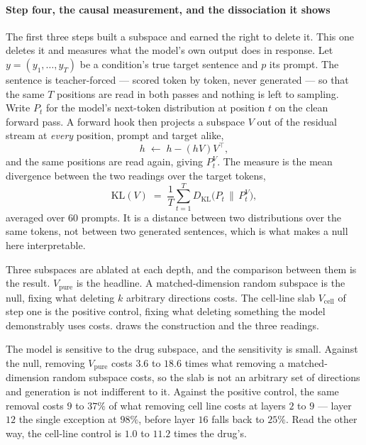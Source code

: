 \paragraph{Step four, the causal measurement, and the dissociation it shows}
The first three steps built a subspace and earned the right to delete it. This
one deletes it and measures what the model's own output does in response. Let
$y = (y_1, \ldots, y_T)$ be a condition's true target sentence and $p$ its
prompt. The sentence is teacher-forced --- scored token by token, never
generated --- so that the same $T$ positions are read in both passes and
nothing is left to sampling. Write $P_t$ for the model's next-token
distribution at position $t$ on the clean forward pass. A forward hook then
projects a subspace $V$ out of the residual stream at \emph{every} position,
prompt and target alike,
\begin{equation}
  h \;\leftarrow\; h - (hV)V^{\top},
\end{equation}
and the same positions are read again, giving $P^{V}_{t}$. The measure is the
mean divergence between the two readings over the target tokens,
\begin{equation}
  \mathrm{KL}(V) \;=\; \frac{1}{T} \sum_{t=1}^{T}
    D_{\mathrm{KL}}\!\big( P_t \,\big\|\, P^{V}_{t} \big),
\end{equation}
averaged over $60$ prompts. It is a distance between two distributions over the
same tokens, not between two generated sentences, which is what makes a null
here interpretable. 

Three subspaces are ablated at each depth, and the comparison between them is
the result. $V_{\textrm{pure}}$ is the headline. A matched-dimension random
subspace is the null, fixing what deleting $k$ arbitrary directions costs. The
cell-line slab $V_{\textrm{cell}}$ of step one is the positive control, fixing
what deleting something the model demonstrably uses costs.  draws
the construction and the three readings.

The model is sensitive to the drug subspace, and the sensitivity is small.
Against the null, removing $V_{\textrm{pure}}$ costs $3.6$ to $18.6$ times what
removing a matched-dimension random subspace costs, so the slab is not an
arbitrary set of directions and generation is not indifferent to it. Against the
positive control, the same removal costs $9$ to $37\%$ of what removing cell
line costs at layers $2$ to $9$ --- layer $12$ the single exception at $98\%$,
before layer $16$ falls back to $25\%$. Read the other way, the cell-line
control is $1.0$ to $11.2$ times the drug's.

